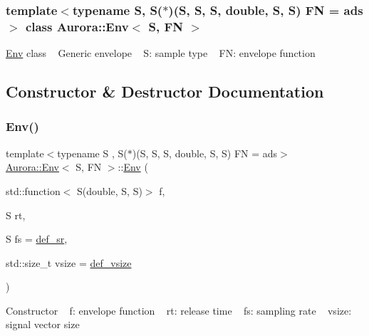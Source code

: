 \subsubsection*{template$<$typename S, S($\ast$)(\+S, S, S, double, S, S) FN = ads$>$\newline
class Aurora\+::\+Env$<$ S, F\+N $>$}

\hyperlink{class_aurora_1_1_env}{Env} class ~\newline
Generic envelope ~\newline
S\+: sample type ~\newline
FN\+: envelope function 

\subsection{Constructor \& Destructor Documentation}
\mbox{\label{class_aurora_1_1_env_a500fe7e05d736a21c801ffa480aceed7}} 
\subsubsection{\texorpdfstring{Env()}{Env()}\hspace{0.1cm}{\footnotesize\ttfamily [1/2]}}
{\footnotesize\ttfamily template$<$typename S , S($\ast$)(\+S, S, S, double, S, S) FN = ads$>$ \\
\hyperlink{class_aurora_1_1_env}{Aurora\+::\+Env}$<$ S, FN $>$\+::\hyperlink{class_aurora_1_1_env}{Env} (\begin{DoxyParamCaption}\item[{std\+::function$<$ S(double, S, S)$>$}]{f,  }\item[{S}]{rt,  }\item[{S}]{fs = {\ttfamily \hyperlink{namespace_aurora_ad49263d809bea98dd422e95bc91bc03e}{def\+\_\+sr}},  }\item[{std\+::size\+\_\+t}]{vsize = {\ttfamily \hyperlink{namespace_aurora_afaaddf667a06e7ce23c667a8b7295263}{def\+\_\+vsize}} }\end{DoxyParamCaption})\hspace{0.3cm}{\ttfamily [inline]}}

Constructor ~\newline
f\+: envelope function ~\newline
rt\+: release time ~\newline
fs\+: sampling rate ~\newline
vsize\+: signal vector size \mbox{\label{class_aurora_1_1_env_a3ea4ee867e90f80331819cceacc55942}} 
